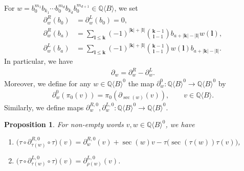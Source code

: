 \documentclass[11pt, a4paper]{amsart}
\newtheorem{proposition}[theorem]{Proposition}
\numberwithin{equation}{section}
\theoremstyle{definition}
\newcommand{\Q}{\mathbb{Q}}
\newcommand{\QB}{\Q\langle B\rangle}
\begin{document}
For $w=b_0^{m_1}b_{k_1}\cdots b_0^{m_d}b_{k_d}b_0^{m_{d+1}}\in\QB$, we set
\begin{align*}
\partial_w^R(b_0)&=\partial_w^L(b_0)=0,\\
\partial_w^R(b_a)&=\sum_{\mathbf{l}\leq \mathbf{k}} (-1)^{|\mathbf{k}|+|\mathbf{l}|}\binom{\mathbf{k}-1}{\mathbf{l}-1} b_{a+|\mathbf{k}|-|\mathbf{l}|}w(\mathbf{l}), \\
\partial_w^L(b_a)&=\sum_{\mathbf{l}\leq \mathbf{k}} (-1)^{|\mathbf{k}|+|\mathbf{l}|}\binom{\mathbf{k}-1}{\mathbf{l}-1} w(\mathbf{l})b_{a+|\mathbf{k}|-|\mathbf{l}|}.
\end{align*}
In particular, we have
\begin{align} \label{eq:partial_LR}
\partial_w=\partial_w^R-\partial_w^L. 
\end{align}
Moreover, we define for any $w\in\QB^0$ the map $\partial_{w}^0:\QB^0\to\QB^0$ by
\begin{align} \label{eq:def_partial0}
\partial_{w}^0(\pi_0(v))=\pi_0(\partial_{\operatorname{sec}(w)}(v)), \qquad v\in \QB.
\end{align}
Similarly, we define maps $\partial_w^{R,0},\partial_w^{L,0}:\QB^0\to\QB^0$.
\begin{proposition} \label{prop:tau_partial} \cite[Proposition 5.5]{Bu25} For non-empty words $v,w\in\QB^0$, we have
\begin{enumerate}[leftmargin=*, label=(\alph*)]
\item $\big(\tau\circ \partial_{\tau(w)}^{R,0}\circ\tau\big)(v)= \partial_w^{R,0}(v)+\operatorname{sec}(w)v-\tau\big(\operatorname{sec}(\tau(w))\tau(v)\big)$,
\item $\big(\tau\circ \partial_{\tau(w)}^{L,0}\circ \tau\big)(v)= \partial_{\rho(w)}^{L,0}(v)$.
\end{enumerate}
\end{proposition}
\end{document}
